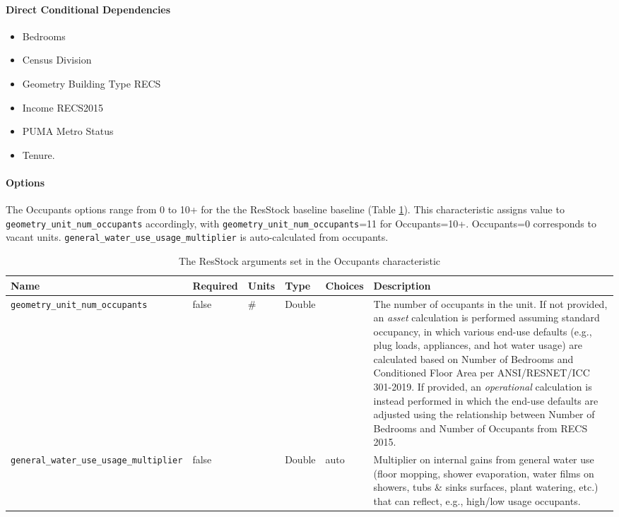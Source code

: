 \paragraph{Direct Conditional Dependencies}
\begin{itemize}
    \item Bedrooms
    \item Census Division
    \item Geometry Building Type RECS
    \item Income RECS2015
    \item PUMA Metro Status
    \item Tenure.
\end{itemize}

\paragraph{Options}
The Occupants options range from 0 to 10+ for the the ResStock baseline baseline (Table \ref{table:hc_arg_def_occupants}). This characteristic assigns value to \texttt{geometry\_unit\_num\_occupants} accordingly, with \texttt{geometry\_unit\_num\_occupants}=11 for Occupants=10+. Occupants=0 corresponds to vacant units. \texttt{general\_water\_use\_usage\_multiplier} is auto-calculated from occupants.

\begin{longtable}[]{|p{3.5cm}|p{1.5cm}|p{1cm}|p{1.1cm}|p{1.9cm}|p{5cm}|} \caption{The ResStock arguments set in the Occupants characteristic} \label{table:hc_arg_def_occupants}  \\
\toprule\noalign{}
Name & Required & Units & Type & Choices & Description \\
\midrule\noalign{}
\endhead
\bottomrule\noalign{}
\endlastfoot
\texttt{geometry\_unit\_num\_occupants} & false & \# & Double & & The
number of occupants in the unit. If not provided, an \emph{asset}
calculation is performed assuming standard occupancy, in which various
end-use defaults (e.g., plug loads, appliances, and hot water usage) are
calculated based on Number of Bedrooms and Conditioned Floor Area per
ANSI/RESNET/ICC 301-2019. If provided, an \emph{operational} calculation
is instead performed in which the end-use defaults are adjusted using
the relationship between Number of Bedrooms and Number of Occupants from
RECS 2015. \\
\hline
\texttt{general\_water\_use\_usage\_multiplier} & false & & Double &
auto & Multiplier on internal gains from general water use (floor
mopping, shower evaporation, water films on showers, tubs \& sinks
surfaces, plant watering, etc.) that can reflect, e.g., high/low usage
occupants.  \\
\end{longtable}


